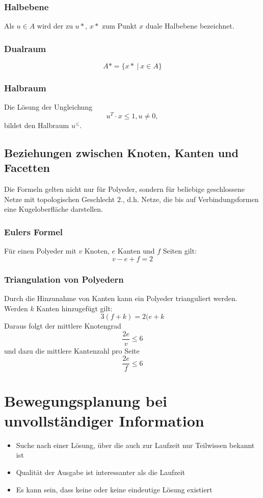 \subsubsection{Halbebene}
Als \(u \in A\) wird der zu \(u*\), \(x*\) zum Punkt \(x\) duale Halbebene bezeichnet.

\subsubsection{Dualraum}
\[A* = \{x*~|~x \in A\}\]

\subsubsection{Halbraum}
Die Lösung der Ungleichung
\[u^T \cdot x \leq 1, u \ne 0,\]
bildet den Halbraum \(u^{\leq}\).


\subsection{Beziehungen zwischen Knoten, Kanten und Facetten}
Die Formeln gelten nicht nur für Polyeder, sondern für beliebige geschlossene Netze mit topologischen Geschlecht \(2\)., d.h. Netze, die bis auf Verbindungsformen eine Kugeloberfläche darstellen.

\subsubsection{Eulers Formel}
Für einen Polyeder mit \(v\) Knoten, \(e\) Kanten und \(f\) Seiten gilt:
\[v-e+f=2\]

\subsubsection{Triangulation von Polyedern}
Durch die Hinzunahme von Kanten kann ein Polyeder trianguliert werden. Werden \(k\) Kanten hinzugefügt gilt:
\[3(f+k) = 2(e+k\]
Daraus folgt der mittlere Knotengrad
\[\frac{2e}{v} \leq 6\]
und dazu die mittlere Kantenzahl pro Seite
\[\frac{2e}{f} \leq 6\]



\section{Bewegungsplanung bei unvollständiger Information}
\begin{itemize}
	\item Suche nach einer Lösung, über die auch zur Laufzeit nur Teilwissen bekannt ist
	\item Qualität der Ausgabe ist interessanter als die Laufzeit
	\item Es kann sein, dass keine oder keine eindeutige Lösung existiert
\end{itemize}



